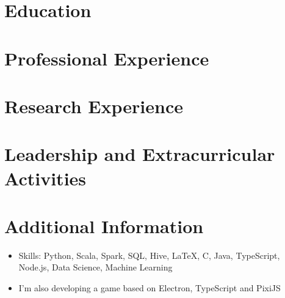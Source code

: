 \documentclass{resumeEN}
\begin{document}
\section{Education}

\pennmaster
\thuundergrad
\umnexchange

\section{Professional Experience}

\msra
\bytedance
\continental
\summitview

\section{Research Experience}

\ryanresearch
\umnresearch
\fifaresearch

\section{Leadership and Extracurricular Activities}

\eydatascience
\cydp
\tkd
\semtech

\section{Additional Information}

\vspace{0.618ex}
\begin{itemize}
\item Skills: Python, Scala, Spark, SQL, Hive, {\LaTeX}, C, Java, TypeScript, Node.js, Data Science, Machine Learning
\item I'm also developing a game based on Electron, TypeScript and PixiJS
\end{itemize}
\end{document}
